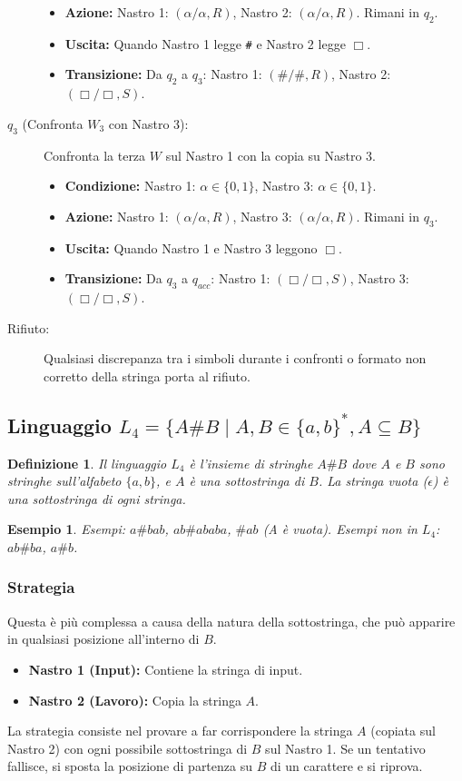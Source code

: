 \documentclass[a4paper, 11pt]{book} %
\newtheorem{definition}[theorem]{Definizione}
\newtheorem{example}[theorem]{Esempio}
\theoremstyle{definition}
\begin{document}
\begin{description}
\begin{itemize}
        \item \textbf{Azione:} Nastro 1: $(\alpha/\alpha, R)$, Nastro 2: $(\alpha/\alpha, R)$. Rimani in $q_2$.
        \item \textbf{Uscita:} Quando Nastro 1 legge \texttt{\#} e Nastro 2 legge $\Box$.
        \item \textbf{Transizione:} Da $q_2$ a $q_3$: Nastro 1: $(\#/\#, R)$, Nastro 2: $(\Box/\Box, S)$.
    \end{itemize}
    \item[$q_3$ (Confronta $W_3$ con Nastro 3):] Confronta la terza $W$ sul Nastro 1 con la copia su Nastro 3.
    \begin{itemize}
        \item \textbf{Condizione:} Nastro 1: $\alpha \in \{0,1\}$, Nastro 3: $\alpha \in \{0,1\}$.
        \item \textbf{Azione:} Nastro 1: $(\alpha/\alpha, R)$, Nastro 3: $(\alpha/\alpha, R)$. Rimani in $q_3$.
        \item \textbf{Uscita:} Quando Nastro 1 e Nastro 3 leggono $\Box$.
        \item \textbf{Transizione:} Da $q_3$ a $q_{acc}$: Nastro 1: $(\Box/\Box, S)$, Nastro 3: $(\Box/\Box, S)$.
    \end{itemize}
    \item[Rifiuto:] Qualsiasi discrepanza tra i simboli durante i confronti o formato non corretto della stringa porta al rifiuto.
\end{description}

\subsection{Linguaggio $L_4 = \{A\#B \mid A,B \in \{a,b\}^*, A \subseteq B \}$}
\begin{definition}
Il linguaggio $L_4$ è l'insieme di stringhe $A\#B$ dove $A$ e $B$ sono stringhe sull'alfabeto $\{a,b\}$, e $A$ è una sottostringa di $B$. La stringa vuota ($\epsilon$) è una sottostringa di ogni stringa.
\end{definition}
\begin{example}
Esempi: $a\#bab$, $ab\#ababa$, $\#ab$ (A è vuota).
Esempi non in $L_4$: $ab\#ba$, $a\#b$.
\end{example}

\subsubsection{Strategia}
Questa è più complessa a causa della natura della sottostringa, che può apparire in qualsiasi posizione all'interno di $B$.
\begin{itemize}
    \item \textbf{Nastro 1 (Input):} Contiene la stringa di input.
    \item \textbf{Nastro 2 (Lavoro):} Copia la stringa $A$.
\end{itemize}
La strategia consiste nel provare a far corrispondere la stringa $A$ (copiata sul Nastro 2) con ogni possibile sottostringa di $B$ sul Nastro 1. Se un tentativo fallisce, si sposta la posizione di partenza su $B$ di un carattere e si riprova.
\end{document}

